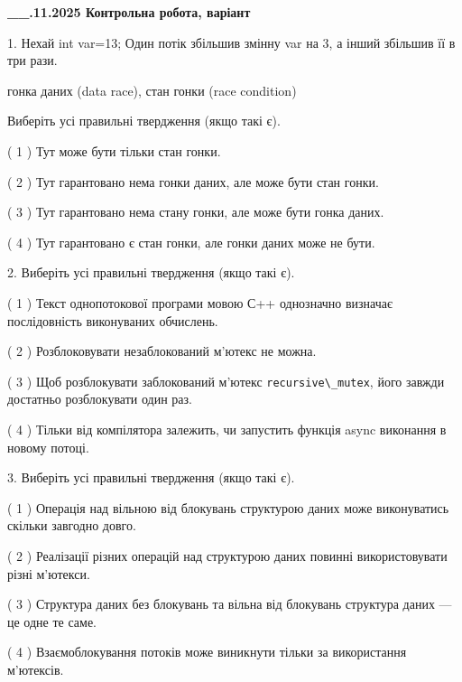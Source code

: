 \documentclass[12pt, ukrainian]{article}
\def\code#1{\Verb!#1!}
\begin{document}
\newpage
\begin {large}

\textbf{\_\_.11.2025 Контрольна робота, варіант  }\par


{
1. Нехай int var=13; Один потік збільшив змінну var на 3, а інший збільшив її в три рази.

гонка даних (data race), стан гонки (race condition)

Виберіть усі правильні твердження (якщо такі є).\par
\vspace{2mm}
( 1 ) Тут може бути тільки стан гонки.%

( 2 ) Тут гарантовано нема гонки даних, але може бути стан гонки.%

( 3 ) Тут гарантовано нема стану гонки, але може бути гонка даних.%

( 4 ) Тут гарантовано є стан гонки, але гонки даних може не бути.%


2. Виберіть усі правильні твердження (якщо такі є).\par
\vspace{2mm}

( 1 ) Текст однопотокової програми мовою С++ однозначно визначає послідовність виконуваних обчислень.%

( 2 ) Розблоковувати незаблокований м’ютекс не можна.%

( 3 ) Щоб розблокувати заблокований м’ютекс \code{recursive\_mutex}, його завжди достатньо розблокувати один раз.%

( 4 ) Тільки від компілятора залежить, чи запустить функція async виконання в новому потоці.%


3. Виберіть усі правильні твердження (якщо такі є).\par
\vspace{2mm}

( 1 ) Операція над вільною від блокувань структурою даних може виконуватись скільки завгодно довго.%

( 2 ) Реалізації різних операцій над структурою даних повинні використовувати різні м’ютекси.%

( 3 ) Структура даних без блокувань та вільна від блокувань структура даних --- це одне те саме.%

( 4 ) Взаємоблокування потоків може виникнути тільки за використання м’ютексів.%


}
\end{large}
\end{document}
